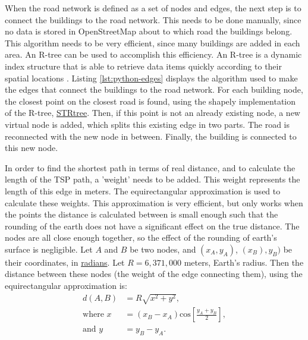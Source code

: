 \documentclass[12pt]{article}
\numberwithin{equation}{section}
\newcommand{\1}[1]{\,I_{#1}} %
\renewcommand{\cos}[1]{\text{cos}\left[#1\right]}
\begin{document}
When the road network is defined as a set of nodes and edges, the next step is to connect the buildings
to the road network. This needs to be done manually, since no data is stored in OpenStreetMap 
about to which road the buildings belong. This algorithm needs to be very efficient, since many 
buildings are added in each area. An R-tree can be used to accomplish this efficiency.
An R-tree is a dynamic index structure that is able to retrieve data items quickly according to 
their spatial locations \citep{guttman1984r}. Listing \ref{lst:python-edges} displays the algorithm
used to make the edges that connect the buildings to the road network. For each building node,
the closest point on the closest road is found, using the shapely implementation of the R-tree,
\url{STRtree}. Then, if this point is not an already existing node, a new virtual node is added,
which splits this existing edge in two parts. The road is reconnected with the new node in between.
Finally, the building is connected to this new node.

In order to find the shortest path in terms of real distance, and to calculate the length of the 
TSP path, a 'weight' needs to be added. This weight represents the length of this edge in meters.
The equirectangular approximation is used to calculate these weights. This approximation is very
efficient, but only works when the points the distance is calculated between is small enough such
that the rounding of the earth does not have a significant effect on the true distance.
The nodes are all close enough together, so the effect of the 
rounding of earth's surface is negligible. Let $A$ and $B$ be two nodes,
and $(x_A,y_A)$, $(x_B),y_B)$ be their coordinates, in \url{radians}. Let $R=6,371,000$ meters, 
Earth's radius. Then the distance between these nodes (the weight of the edge connecting them),
using the equirectangular approximation is:
\begin{align}
  \label{eq:equirectangluar_approx}
  d(A,B)	&=R\sqrt{x^2+y^2},\\
  \text{where }x&=(x_B-x_A)\cos{\frac{y_A+y_B}{2}},\\
  \text{and }y	&=y_B-y_A.
\end{align}
\end{document}
